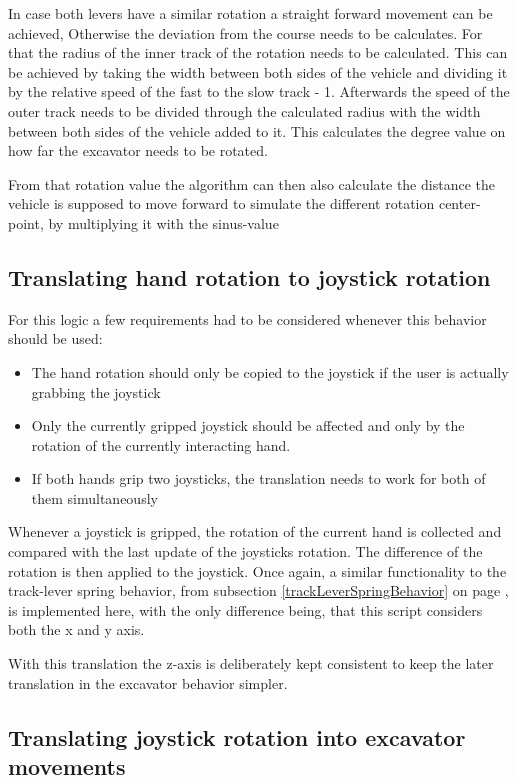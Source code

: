 \documentclass[journal]{vgtc}                     %
\begin{document}
In case both levers have a similar rotation a straight forward movement can be achieved, Otherwise the deviation from the course needs to be calculates. For that the radius of the inner track of the rotation needs to be calculated. This can be achieved by taking the width between both sides of the vehicle and dividing it by the relative speed of the fast to the slow track - 1. Afterwards the speed of the outer track needs to be divided through the calculated radius with the width between both sides of the vehicle added to it. This calculates the degree value on how far the excavator needs to be rotated.

From that rotation value the algorithm can then also calculate the distance the vehicle is supposed to move forward to simulate the different rotation center-point, by multiplying it with the sinus-value

\subsection{Translating hand rotation to joystick rotation}

For this logic a few requirements had to be considered whenever this behavior should be used:

\begin{itemize}
  \item The hand rotation should only be copied to the joystick if the user is actually grabbing the joystick
  \item Only the currently gripped joystick should be affected and only by the rotation of the currently interacting hand.
  \item If both hands grip two joysticks, the translation needs to work for both of them simultaneously
\end{itemize}

Whenever a joystick is gripped, the rotation of the current hand is collected and compared with the last update of the joysticks rotation. The difference of the rotation is then applied to the joystick. Once again, a similar functionality to the track-lever spring behavior, from subsection \ref{trackLeverSpringBehavior} on page \pageref{trackLeverSpringBehavior}, is implemented here, with the only difference being, that this script considers both the x and y axis.

With this translation the z-axis  is deliberately kept consistent to keep the later translation in the excavator behavior simpler.

\subsection{Translating joystick rotation into excavator movements}
\end{document}
